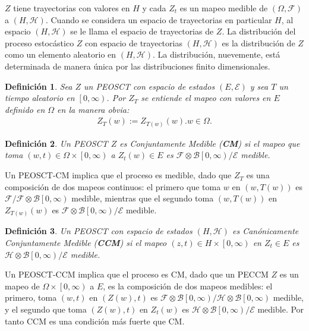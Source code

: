 \documentclass{article}
\newtheorem{Def}{Definición}
\begin{document}
$Z$ tiene trayectorias con valores en $H$ y cada $Z_{t}$ es un mapeo medible de $\left(\Omega,\mathcal{F}\right)$ a $\left(H,\mathcal{H}\right)$. Cuando se considera un espacio de trayectorias en particular $H$, al espacio $\left(H,\mathcal{H}\right)$ se le llama el espacio de trayectorias de $Z$. La distribuci\'on del proceso estoc\'astico $Z$ con espacio de trayectorias $\left(H,\mathcal{H}\right)$ es la distribuci\'on de $Z$ como  un elemento aleatorio en $\left(H,\mathcal{H}\right)$. La distribuci\'on, nuevemente, est\'a determinada de manera \'unica por las distribuciones finito dimensionales.

\begin{Def}
Sea $Z$ un PEOSCT  con espacio de estados $\left(E,\mathcal{E}\right)$ y sea $T$ un tiempo aleatorio en $\left[0,\infty\right)$. Por $Z_{T}$ se entiende el mapeo con valores en $E$ definido en $\Omega$ en la manera obvia:
\begin{eqnarray*}
Z_{T}\left(w\right):=Z_{T\left(w\right)}\left(w\right). w\in\Omega.
\end{eqnarray*}
\end{Def}

\begin{Def}
Un PEOSCT $Z$ es Conjuntamente Medible (\textbf{CM}) si el mapeo que toma $\left(w,t\right)\in\Omega\times\left[0,\infty\right)$ a $Z_{t}\left(w\right)\in E$ es $\mathcal{F}\otimes\mathcal{B}\left[0,\infty\right)/\mathcal{E}$ medible.
\end{Def}

Un PEOSCT-CM implica que el proceso es medible, dado que $Z_{T}$ es una composici\'on  de dos mapeos continuos: el primero que toma $w$ en $\left(w,T\left(w\right)\right)$ es $\mathcal{F}/\mathcal{F}\otimes\mathcal{B}\left[0,\infty\right)$ medible, mientras que el segundo toma $\left(w,T\left(w\right)\right)$ en $Z_{T\left(w\right)}\left(w\right)$ es $\mathcal{F}\otimes\mathcal{B}\left[0,\infty\right)/\mathcal{E}$ medible.

\begin{Def}
Un PEOSCT con espacio de estados $\left(H,\mathcal{H}\right)$ es Can\'onicamente Conjuntamente Medible (\textbf{CCM}) si el mapeo $\left(z,t\right)\in H\times\left[0,\infty\right)$ en $Z_{t}\in E$ es $\mathcal{H}\otimes\mathcal{B}\left[0,\infty\right)/\mathcal{E}$ medible.
\end{Def}

Un PEOSCT-CCM implica que el proceso es CM, dado que un PECCM $Z$ es un mapeo de $\Omega\times\left[0,\infty\right)$ a $E$, es la composici\'on de dos mapeos medibles: el primero, toma $\left(w,t\right)$ en $\left(Z\left(w\right),t\right)$ es $\mathcal{F}\otimes\mathcal{B}\left[0,\infty\right)/\mathcal{H}\otimes\mathcal{B}\left[0,\infty\right)$ medible, y el segundo que toma $\left(Z\left(w\right),t\right)$  en $Z_{t}\left(w\right)$ es $\mathcal{H}\otimes\mathcal{B}\left[0,\infty\right)/\mathcal{E}$ medible. Por tanto CCM es una condici\'on m\'as fuerte que CM.
\end{document}
